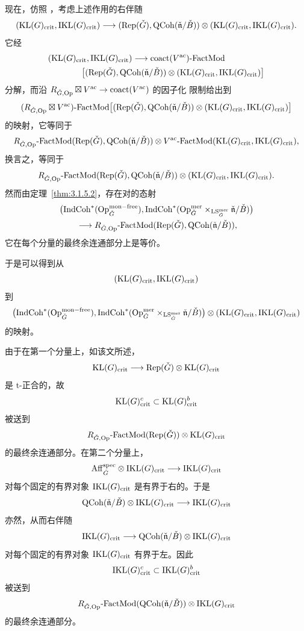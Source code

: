 现在，仿照 \cite[第 5.3 节]{ABC+24a}，考虑上述作用的右伴随
\[
(\mathrm{KL}(G)_{\mathrm{crit}},\mathrm{IKL}(G)_{\mathrm{crit}})\longrightarrow
(\mathrm{Rep}(\check G),\mathrm{QCoh}(\check{\mathfrak{n}}/\check B))\otimes
(\mathrm{KL}(G)_{\mathrm{crit}},\mathrm{IKL}(G)_{\mathrm{crit}}).
\]
它经
\begin{align*}
&(\mathrm{KL}(G)_{\mathrm{crit}},\mathrm{IKL}(G)_{\mathrm{crit}})\longrightarrow
\operatorname{coact}(V^{\mathrm{ac}})\text{-}\mathrm{FactMod}\\
&\qquad\qquad\bigl[(\mathrm{Rep}(\check G),\mathrm{QCoh}(\check{\mathfrak{n}}/\check B))\otimes
(\mathrm{KL}(G)_{\mathrm{crit}},\mathrm{IKL}(G)_{\mathrm{crit}})\bigr]
\end{align*}
分解，而沿 $R_{\check G,\mathrm{Op}}\boxtimes V^{\mathrm{ac}}\to \operatorname{coact}(V^{\mathrm{ac}})$ 的因子化
限制给出到
\[
(R_{\check G,\mathrm{Op}}\boxtimes V^{\mathrm{ac}})\text{-}\mathrm{FactMod}
\bigl[(\mathrm{Rep}(\check G),\mathrm{QCoh}(\check{\mathfrak{n}}/\check B))\otimes
(\mathrm{KL}(G)_{\mathrm{crit}},\mathrm{IKL}(G)_{\mathrm{crit}})\bigr]
\]
的映射，它等同于
\[
R_{\check G,\mathrm{Op}}\text{-}\mathrm{FactMod}(\mathrm{Rep}(\check G),\mathrm{QCoh}(\check{\mathfrak{n}}/\check B))
\otimes V^{\mathrm{ac}}\text{-}\mathrm{FactMod}(\mathrm{KL}(G)_{\mathrm{crit}},\mathrm{IKL}(G)_{\mathrm{crit}}),
\]
换言之，等同于
\[
R_{\check G,\mathrm{Op}}\text{-}\mathrm{FactMod}(\mathrm{Rep}(\check G),\mathrm{QCoh}(\check{\mathfrak{n}}/\check B))
\otimes (\mathrm{KL}(G)_{\mathrm{crit}},\mathrm{IKL}(G)_{\mathrm{crit}}).
\]
然而由定理~\ref{thm:3.1.5.2}，存在对的态射
\begin{align*}
&\bigl(\mathrm{IndCoh}^{*}(\mathrm{Op}^{\mathrm{mon-free}}_{\check G}),
\mathrm{IndCoh}^{*}(\mathrm{Op}^{\mathrm{mer}}_{\check G}
\times_{\mathrm{LS}^{\mathrm{mer}}_{\check G}}\check{\mathfrak{n}}/\check B)\bigr)\\
&\qquad\longrightarrow
R_{\check G,\mathrm{Op}}\text{-}\mathrm{FactMod}(\mathrm{Rep}(\check G),\mathrm{QCoh}(\check{\mathfrak{n}}/\check B)),
\end{align*}
它在每个分量的最终余连通部分上是等价。

于是可以得到从
\[
(\mathrm{KL}(G)_{\mathrm{crit}},\mathrm{IKL}(G)_{\mathrm{crit}})
\]
到
\[
\bigl(\mathrm{IndCoh}^{*}(\mathrm{Op}^{\mathrm{mon-free}}_{\check G}),
\mathrm{IndCoh}^{*}(\mathrm{Op}^{\mathrm{mer}}_{\check G}
\times_{\mathrm{LS}^{\mathrm{mer}}_{\check G}}\check{\mathfrak{n}}/\check B)\bigr)
\otimes (\mathrm{KL}(G)_{\mathrm{crit}},\mathrm{IKL}(G)_{\mathrm{crit}})
\]
的映射。

由于在第一个分量上，如该文所述，
\[
\mathrm{KL}(G)_{\mathrm{crit}}\longrightarrow \mathrm{Rep}(\check G)\otimes \mathrm{KL}(G)_{\mathrm{crit}}
\]
是 t-正合的，故
\[
\mathrm{KL}(G)^{c}_{\mathrm{crit}}\subset \mathrm{KL}(G)^{b}_{\mathrm{crit}}
\]
被送到
\[
R_{\check G,\mathrm{Op}}\text{-}\mathrm{FactMod}(\mathrm{Rep}(\check G))\otimes \mathrm{KL}(G)_{\mathrm{crit}}
\]
的最终余连通部分。在第二个分量上，
\[
\mathrm{Aff}^{\mathrm{spec}}_{\check G}\otimes \mathrm{IKL}(G)_{\mathrm{crit}}\longrightarrow \mathrm{IKL}(G)_{\mathrm{crit}}
\]
对每个固定的有界对象 $\mathrm{IKL}(G)_{\mathrm{crit}}$ 是有界于右的。于是
\[
\mathrm{QCoh}(\check{\mathfrak{n}}/\check B)\otimes \mathrm{IKL}(G)_{\mathrm{crit}}\longrightarrow \mathrm{IKL}(G)_{\mathrm{crit}}
\]
亦然，从而右伴随
\[
\mathrm{IKL}(G)_{\mathrm{crit}}\longrightarrow \mathrm{QCoh}(\check{\mathfrak{n}}/\check B)\otimes \mathrm{IKL}(G)_{\mathrm{crit}}
\]
对每个固定的有界对象 $\mathrm{IKL}(G)_{\mathrm{crit}}$ 有界于左。因此
\[
\mathrm{IKL}(G)^{c}_{\mathrm{crit}}\subset \mathrm{IKL}(G)^{b}_{\mathrm{crit}}
\]
被送到
\[
R_{\check G,\mathrm{Op}}\text{-}\mathrm{FactMod}(\mathrm{QCoh}(\check{\mathfrak{n}}/\check B))
\otimes \mathrm{IKL}(G)_{\mathrm{crit}}
\]
的最终余连通部分。

